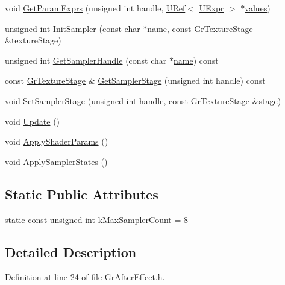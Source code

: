 \begin{CompactItemize}
\item 
void \hyperlink{class_gr_after_effect_ee972346c19d4fbac65ac837bb213ae0}{GetParamExprs} (unsigned int handle, \hyperlink{class_u_ref}{URef}$<$ \hyperlink{class_u_expr}{UExpr} $>$ $\ast$\hyperlink{glext__bak_8h_787b90126e660bfa88ef8aa99f74ca41}{values})
\item 
unsigned int \hyperlink{class_gr_after_effect_091017394b0a44d2809aff92ad70aeed}{InitSampler} (const char $\ast$\hyperlink{glext__bak_8h_bb62efe59ccdd153ce42e1a418352209}{name}, const \hyperlink{class_gr_texture_stage}{GrTextureStage} \&textureStage)
\item 
unsigned int \hyperlink{class_gr_after_effect_0778fe881cb1fe1ebe2126d27bd8f34f}{GetSamplerHandle} (const char $\ast$\hyperlink{glext__bak_8h_bb62efe59ccdd153ce42e1a418352209}{name}) const 
\item 
const \hyperlink{class_gr_texture_stage}{GrTextureStage} \& \hyperlink{class_gr_after_effect_13d36149166c9667c6a6994c1f3c1cdc}{GetSamplerStage} (unsigned int handle) const 
\item 
void \hyperlink{class_gr_after_effect_7c18aebb106dd993ad091cd64292d528}{SetSamplerStage} (unsigned int handle, const \hyperlink{class_gr_texture_stage}{GrTextureStage} \&stage)
\item 
void \hyperlink{class_gr_after_effect_63aea2d5172f926dc628ff07f90edec6}{Update} ()
\item 
void \hyperlink{class_gr_after_effect_2fddc6ab0ea8bceb23704adfe6c1449c}{ApplyShaderParams} ()
\item 
void \hyperlink{class_gr_after_effect_d05cf40a9229d30ffa9148dc2f977d87}{ApplySamplerStates} ()
\end{CompactItemize}
\subsection*{Static Public Attributes}
\begin{CompactItemize}
\item 
static const unsigned int \hyperlink{class_gr_after_effect_ff8b6c747e2b149a857a58f0491a4189}{kMaxSamplerCount} = 8
\end{CompactItemize}


\subsection{Detailed Description}


Definition at line 24 of file GrAfterEffect.h.

